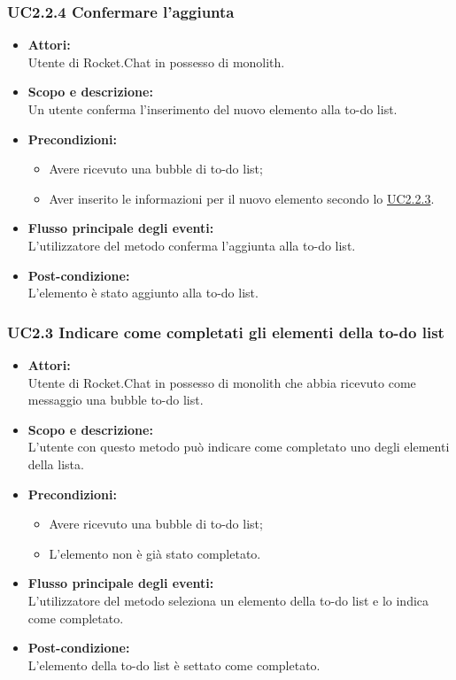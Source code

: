 \subsubsection{UC2.2.4 Confermare l’aggiunta} \label{UC2.2.4}

\begin{itemize}
	\item \textbf{Attori:}
	\\Utente di Rocket.Chat in possesso di monolith.
	\item \textbf{Scopo e descrizione:} 
	\\Un utente conferma l’inserimento del nuovo elemento alla to-do list.
	\item \textbf{Precondizioni:}
	\begin{itemize}
		\item Avere ricevuto una bubble di to-do list;
		\item Aver inserito le informazioni per il nuovo elemento secondo lo \hyperref[UC2.2.3]{UC2.2.3}.
	\end{itemize}
	\item \textbf{Flusso principale degli eventi:}
	\\L’utilizzatore del metodo conferma l’aggiunta alla to-do list.
	\item \textbf{Post-condizione:}
	\\L’elemento è stato aggiunto alla to-do list.
\end{itemize}

\subsubsection{UC2.3 Indicare come completati gli elementi della to-do list} \label{UC2.3}

\begin{itemize}
	\item \textbf{Attori:}
	\\Utente di Rocket.Chat in possesso di monolith che abbia ricevuto come messaggio una bubble to-do list.
	\item \textbf{Scopo e descrizione:} 
	\\L’utente con questo metodo può indicare come completato uno degli elementi della lista.
	\item \textbf{Precondizioni:}
	\begin{itemize}
		\item Avere ricevuto una bubble di to-do list;
		\item L’elemento non è già stato completato.
	\end{itemize}
	\item \textbf{Flusso principale degli eventi:}
	\\L’utilizzatore del metodo seleziona un elemento della to-do list e lo indica come completato. 
	\item \textbf{Post-condizione:}
	\\L’elemento della to-do list è settato come completato.
\end{itemize}

